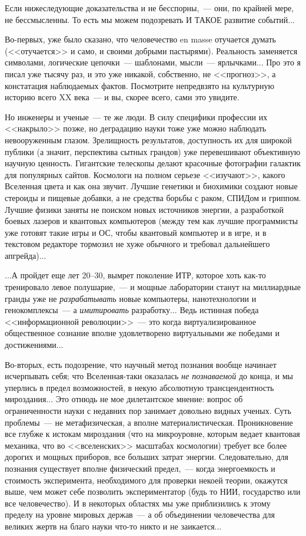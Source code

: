 \documentclass{scrbook}
\newcommand{\flqq}{<<}
\newcommand{\frqq}{>>}
\newcommand{\mdash}{~--- }
\newcommand{\ndash}{--}
\newcommand{\commamdash}{~--- } %
\begin{document}
Если нижеследующие доказательства и не бесспорны,{\commamdash}они, по крайней мере, не бессмысленны. То есть мы можем подозревать И ТАКОЕ развитие событий...

Во-первых, уже было сказано, что человечество en masse отучается думать ({\flqq}отучается{\frqq} и само, и своими добрыми пастырями). Реальность заменяется символами, логические цепочки{\mdash}шаблонами, мысли{\mdash}ярлычками... Про это я писал уже тысячу раз, и это уже никакой, собственно, не {\flqq}прогноз{\frqq}, а констатация наблюдаемых фактов. Посмотрите непредвзято на культурную историю всего XX века{\mdash}и вы, скорее всего, сами это увидите.

Но инженеры и ученые{\mdash}те же люди. В силу специфики профессии их {\flqq}накрыло{\frqq} позже, но деградацию науки тоже уже можно наблюдать невооруженным глазом. Зрелищность результатов, доступность их для широкой публики (а значит, перспектива сытных грандов) уже перевешивают объективную научную ценность. Гигантские телескопы делают красочные фотографии галактик для популярных сайтов. Космологи на полном серьезе {\flqq}изучают{\frqq}, какого Вселенная цвета и как она звучит. Лучшие генетики и биохимики создают новые стероиды и пищевые добавки, а не средства борьбы с раком, СПИДом и гриппом. Лучшие физики заняты не поиском новых источников энергии, а разработкой боевых лазеров и квантовых компьютеров (между тем как лучшие программисты уже готовят такие игры и ОС, чтобы квантовый компьютер и в игре, и в текстовом редакторе тормозил не хуже обычного и требовал дальнейшего апгрейда)...

...А пройдет еще лет 20{\ndash}30, вымрет поколение ИТР, которое хоть как-то тренировало левое полушарие,{\commamdash}и мощные лаборатории станут на миллиардные гранды уже не \emph{разрабатывать} новые компьютеры, нанотехнологии и генокомплексы{\mdash}а \emph{имитировать} разработку... Ведь истинная победа {\flqq}информационной революции{\frqq}{\mdash}это когда виртуализированное общественное сознание вполне удовлетворено виртуальными же победами и достижениями...

Во-вторых, есть подозрение, что научный метод познания вообще начинает исчерпывать себя; что Вселенная-таки оказалась \emph{не познаваемой} до конца, и мы уперлись в предел возможностей, в некую абсолютную трансцендентность мироздания... Это отнюдь не мое дилетантское мнение: вопрос об ограниченности науки с недавних пор занимает довольно видных ученых. Суть проблемы{\mdash}не метафизическая, а вполне материалистическая. Проникновение все глубже к истокам мироздания (что на микроуровне, которым ведает квантовая механика, что во {\flqq}вселенских{\frqq} масштабах космологии) требует все более дорогих и мощных приборов, все больших затрат энергии. Следовательно, для познания существует вполне физический предел,{\commamdash}когда энергоемкость и стоимость эксперимента, необходимого для проверки некоей теории, окажутся выше, чем может себе позволить экспериментатор (будь то НИИ, государство или все человечество). И в некоторых областях мы уже приблизились к этому пределу на уровне мировых держав{\mdash}а об объединении человечества для великих жертв на благо науки что-то никто и не заикается...
\end{document}
